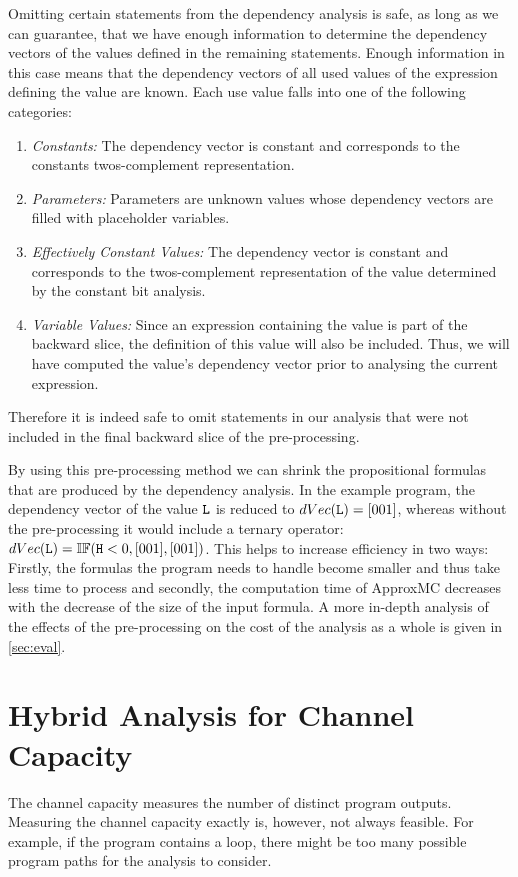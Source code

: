 Omitting certain statements from the dependency analysis is safe, as long as we can guarantee, that we have enough information to determine the dependency vectors of the values defined in the remaining statements. Enough information in this case means that the dependency vectors of all used values of the expression defining the value are known. Each use value falls into one of the following categories:
\begin{enumerate}
    \setlength\itemsep{0em}
    \item \emph{Constants: }The dependency vector is constant and corresponds to the constants twos-complement representation.
    \item \emph{Parameters: }Parameters are unknown values whose dependency vectors are filled with placeholder variables.
    \item \emph{Effectively Constant Values: }The dependency vector is constant and corresponds to the twos-complement representation of the value determined by the constant bit analysis.
    \item \emph{Variable Values: }Since an expression containing the value is part of the backward slice, the definition of this value will also be included. Thus, we will have computed the value's dependency vector prior to analysing the current expression.
\end{enumerate}
Therefore it is indeed safe to omit statements in our analysis that were not included in the final backward slice of the pre-processing.

By using this pre-processing method we can shrink the propositional formulas that are produced by the dependency analysis. In the example program, the dependency vector of the value $\mathtt{L}$ is reduced to $dVec(\mathtt{L}) = [001]$, whereas without the pre-processing it would include a ternary operator: $dVec(\mathtt{L}) = \mathbb{IF}(\mathtt{H} < 0, [001], [001])$.
This helps to increase efficiency in two ways: Firstly, the formulas the program needs to handle become smaller and thus take less time to process and secondly, the computation time of ApproxMC decreases with the decrease of the size of the input formula. A more in-depth analysis of the effects of the pre-processing on the cost of the analysis as a whole is given in \ref{sec:eval}.

\section{Hybrid Analysis for Channel Capacity}\label{sec:hybridcc}
The channel capacity measures the number of distinct program outputs. Measuring the channel capacity exactly is, however, not always feasible. For example, if the program contains a loop, there might be too many possible program paths for the analysis to consider.

